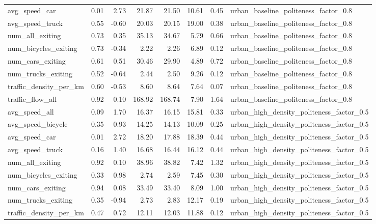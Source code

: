 \begin{table}[ht]
\begin{tabular}{lrrrrrrl}
  avg\_speed\_car & 0.01 & 2.73 & 21.87 & 21.50 & 10.61 & 0.45 & urban\_baseline\_politeness\_factor\_0.8 \\ 
  avg\_speed\_truck & 0.55 & -0.60 & 20.03 & 20.15 & 19.00 & 0.38 & urban\_baseline\_politeness\_factor\_0.8 \\ 
  num\_all\_exiting & 0.73 & 0.35 & 35.13 & 34.67 & 5.79 & 0.66 & urban\_baseline\_politeness\_factor\_0.8 \\ 
  num\_bicycles\_exiting & 0.73 & -0.34 & 2.22 & 2.26 & 6.89 & 0.12 & urban\_baseline\_politeness\_factor\_0.8 \\ 
  num\_cars\_exiting & 0.61 & 0.51 & 30.46 & 29.90 & 4.89 & 0.72 & urban\_baseline\_politeness\_factor\_0.8 \\ 
  num\_trucks\_exiting & 0.52 & -0.64 & 2.44 & 2.50 & 9.26 & 0.12 & urban\_baseline\_politeness\_factor\_0.8 \\ 
  traffic\_density\_per\_km & 0.60 & -0.53 & 8.60 & 8.64 & 7.64 & 0.07 & urban\_baseline\_politeness\_factor\_0.8 \\ 
  traffic\_flow\_all & 0.92 & 0.10 & 168.92 & 168.74 & 7.90 & 1.64 & urban\_baseline\_politeness\_factor\_0.8 \\ 
  avg\_speed\_all & 0.09 & 1.70 & 16.37 & 16.15 & 15.81 & 0.33 & urban\_high\_density\_politeness\_factor\_0.5 \\ 
  avg\_speed\_bicycle & 0.35 & 0.93 & 14.25 & 14.13 & 10.09 & 0.25 & urban\_high\_density\_politeness\_factor\_0.5 \\ 
  avg\_speed\_car & 0.01 & 2.72 & 18.20 & 17.88 & 18.39 & 0.44 & urban\_high\_density\_politeness\_factor\_0.5 \\ 
  avg\_speed\_truck & 0.16 & 1.40 & 16.68 & 16.44 & 16.12 & 0.44 & urban\_high\_density\_politeness\_factor\_0.5 \\ 
  num\_all\_exiting & 0.92 & 0.10 & 38.96 & 38.82 & 7.42 & 1.32 & urban\_high\_density\_politeness\_factor\_0.5 \\ 
  num\_bicycles\_exiting & 0.33 & 0.98 & 2.74 & 2.59 & 7.45 & 0.30 & urban\_high\_density\_politeness\_factor\_0.5 \\ 
  num\_cars\_exiting & 0.94 & 0.08 & 33.49 & 33.40 & 8.09 & 1.00 & urban\_high\_density\_politeness\_factor\_0.5 \\ 
  num\_trucks\_exiting & 0.35 & -0.94 & 2.73 & 2.83 & 12.17 & 0.19 & urban\_high\_density\_politeness\_factor\_0.5 \\ 
  traffic\_density\_per\_km & 0.47 & 0.72 & 12.11 & 12.03 & 11.88 & 0.12 & urban\_high\_density\_politeness\_factor\_0.5 \\ 

\end{tabular}
\end{table}
